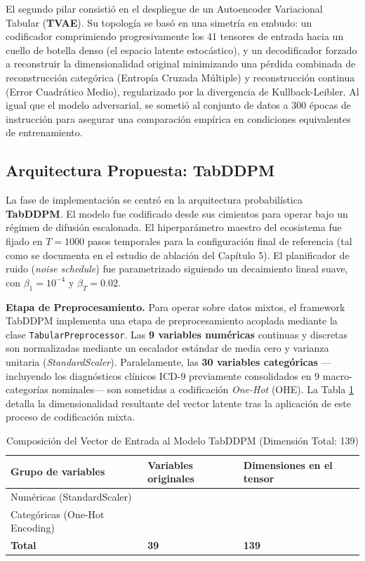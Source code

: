 El segundo pilar consistió en el despliegue de un Autoencoder Variacional Tabular (\textbf{TVAE}). Su topología se basó en una simetría en embudo: un codificador comprimiendo progresivamente los 41 tensores de entrada hacia un cuello de botella denso (el espacio latente estocástico), y un decodificador forzado a reconstruir la dimensionalidad original minimizando una pérdida combinada de reconstrucción categórica (Entropía Cruzada Múltiple) y reconstrucción continua (Error Cuadrático Medio), regularizado por la divergencia de Kullback-Leibler. Al igual que el modelo adversarial, se sometió al conjunto de datos a 300 épocas de instrucción para asegurar una comparación empírica en condiciones equivalentes de entrenamiento.

\subsection{Arquitectura Propuesta: TabDDPM}

La fase de implementación se centró en la arquitectura probabilística \textbf{TabDDPM}. El modelo fue codificado desde sus cimientos para operar bajo un régimen de difusión escalonada. El hiperparámetro maestro del ecosistema fue fijado en $T = 1000$ pasos temporales para la configuración final de referencia (tal como se documenta en el estudio de ablación del Capítulo 5). El planificador de ruido (\textit{noise schedule}) fue parametrizado siguiendo un decaimiento lineal suave, con $\beta_1 = 10^{-4}$ y $\beta_T = 0.02$.

\textbf{Etapa de Preprocesamiento.} Para operar sobre datos mixtos, el framework TabDDPM implementa una etapa de preprocesamiento acoplada mediante la clase \texttt{TabularPreprocessor}. Las \textbf{9 variables numéricas} continuas y discretas son normalizadas mediante un escalador estándar de media cero y varianza unitaria (\textit{StandardScaler}). Paralelamente, las \textbf{30 variables categóricas} —incluyendo los diagnósticos clínicos ICD-9 previamente consolidados en 9 macro-categorías nominales— son sometidas a codificación \textit{One-Hot} (OHE). La Tabla \ref{tab:ohe_dims} detalla la dimensionalidad resultante del vector latente tras la aplicación de este proceso de codificación mixta.

\begin{table}[htbp]
\centering
\caption{Composición del Vector de Entrada al Modelo TabDDPM (Dimensión Total: 139)}
\label{tab:ohe_dims}
\begin{tabularx}{\textwidth}{>{\raggedright\arraybackslash}X >{\centering\arraybackslash}p{4.2cm} >{\centering\arraybackslash}p{4.2cm}}
\toprule
\textbf{Grupo de variables} & \textbf{Variables originales} & \textbf{Dimensiones en el tensor} \\
\midrule
\rowcolor{gray!10} Numéricas (StandardScaler) & 9 & 9 \\
Categóricas (One-Hot Encoding) & 30 & 130 \\
\midrule
\rowcolor{uaxblue!10} \textbf{Total} & \textbf{39} & \textbf{139} \\
\bottomrule
\end{tabularx}
\end{table}

